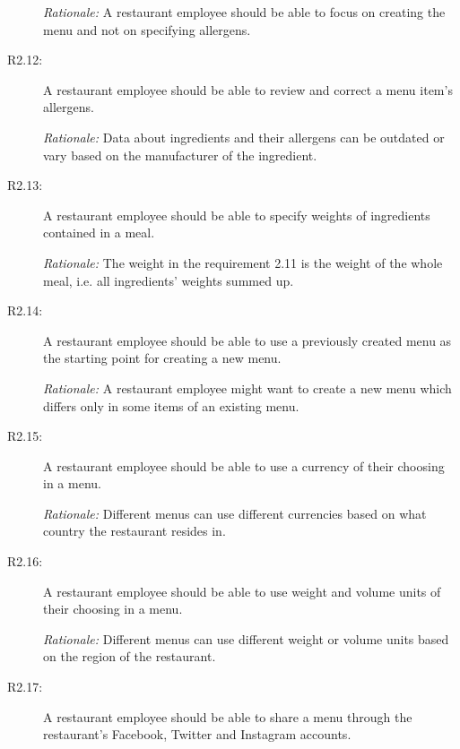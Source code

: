 \begin{description}
    \emph{Rationale:} A restaurant employee should be able to focus on creating the menu and not on specifying allergens.
    \item [R2.12:] A restaurant employee should be able to review and correct a menu item's allergens.

    \emph{Rationale:} Data about ingredients and their allergens can be outdated or vary based on the manufacturer of the ingredient.
    \item [R2.13:] A restaurant employee should be able to specify weights of ingredients contained in a meal.

    \emph{Rationale:} The weight in the requirement 2.11 is the weight of the whole meal, i.e. all ingredients' weights summed up.
    \item [R2.14:] A restaurant employee should be able to use a previously created menu as the starting point for creating a new menu.

    \emph{Rationale:} A restaurant employee might want to create a new menu which differs only in some items of an existing menu.
    \item [R2.15:] A restaurant employee should be able to use a currency of their choosing in a menu.

    \emph{Rationale:} Different menus can use different currencies based on what country the restaurant resides in.
    \item [R2.16:] A restaurant employee should be able to use weight and volume units of their choosing in a menu.

    \emph{Rationale:} Different menus can use different weight or volume units based on the region of the restaurant.
    \item [R2.17:] A restaurant employee should be able to share a menu through the restaurant's Facebook, Twitter and Instagram accounts.
  \end{description}

\newpage

